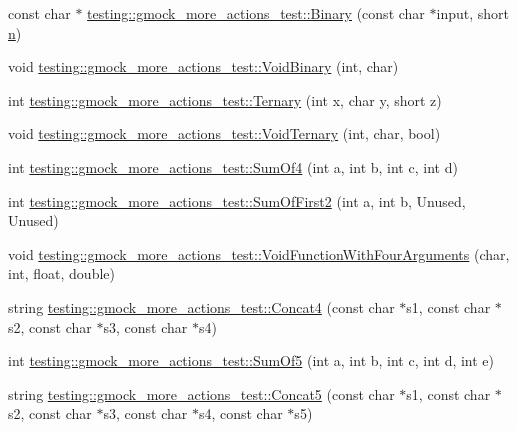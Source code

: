 \begin{DoxyCompactItemize}
const char $\ast$ \hyperlink{namespacetesting_1_1gmock__more__actions__test_a853c9f048674a60798b930750b74a1df}{testing\+::gmock\+\_\+more\+\_\+actions\+\_\+test\+::\+Binary} (const char $\ast$input, short \hyperlink{app_2main_8cpp_acfc02ec89670db29251fda6a66602ce2}{n})
\item 
void \hyperlink{namespacetesting_1_1gmock__more__actions__test_aec71bd163ae67ec97e073bd13a4ac039}{testing\+::gmock\+\_\+more\+\_\+actions\+\_\+test\+::\+Void\+Binary} (int, char)
\item 
int \hyperlink{namespacetesting_1_1gmock__more__actions__test_ab98b352528a0b72625b4710a6fc648a1}{testing\+::gmock\+\_\+more\+\_\+actions\+\_\+test\+::\+Ternary} (int x, char y, short z)
\item 
void \hyperlink{namespacetesting_1_1gmock__more__actions__test_ac41b49dc8ab365ccad7b332796421cd4}{testing\+::gmock\+\_\+more\+\_\+actions\+\_\+test\+::\+Void\+Ternary} (int, char, bool)
\item 
int \hyperlink{namespacetesting_1_1gmock__more__actions__test_a41c348fff8608825239a276b8426a475}{testing\+::gmock\+\_\+more\+\_\+actions\+\_\+test\+::\+Sum\+Of4} (int a, int b, int c, int d)
\item 
int \hyperlink{namespacetesting_1_1gmock__more__actions__test_aaa60ddffb96ddc3a73b0b22929ca5bec}{testing\+::gmock\+\_\+more\+\_\+actions\+\_\+test\+::\+Sum\+Of\+First2} (int a, int b, Unused, Unused)
\item 
void \hyperlink{namespacetesting_1_1gmock__more__actions__test_a8c952be61635486e84c1eca3bf3acd9b}{testing\+::gmock\+\_\+more\+\_\+actions\+\_\+test\+::\+Void\+Function\+With\+Four\+Arguments} (char, int, float, double)
\item 
string \hyperlink{namespacetesting_1_1gmock__more__actions__test_aa423cedcbd858249b616f0c537a1e4cf}{testing\+::gmock\+\_\+more\+\_\+actions\+\_\+test\+::\+Concat4} (const char $\ast$s1, const char $\ast$s2, const char $\ast$s3, const char $\ast$s4)
\item 
int \hyperlink{namespacetesting_1_1gmock__more__actions__test_a38e64569bf08e83c6db22c1fb0fe0af6}{testing\+::gmock\+\_\+more\+\_\+actions\+\_\+test\+::\+Sum\+Of5} (int a, int b, int c, int d, int e)
\item 
string \hyperlink{namespacetesting_1_1gmock__more__actions__test_a2ac9917d1aa19cd7ac32bba837f4eacc}{testing\+::gmock\+\_\+more\+\_\+actions\+\_\+test\+::\+Concat5} (const char $\ast$s1, const char $\ast$s2, const char $\ast$s3, const char $\ast$s4, const char $\ast$s5)
\item 

\end{DoxyCompactItemize}
